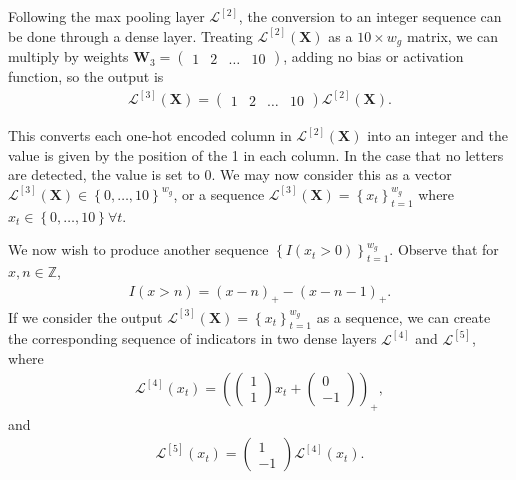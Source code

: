 \documentclass{somasmsc}
\begin{document}
Following the max pooling layer $\mathcal{L}^{\left[2\right]}$, the conversion to an integer sequence can be done through a dense layer. Treating $\mathcal{L}^{\left[2\right]}\left(\mathbf{X}\right)$ as a $10 \times w_g$ matrix, we can multiply by weights $\mathbf{W}_3 =
\begin{pmatrix}
    1 & 2 & \dots & 10
\end{pmatrix}$, adding no bias or activation function, so the output is
\begin{align*}
\mathcal{L}^{\left[3\right]}\left(\mathbf{X}\right) =
\begin{pmatrix}
    1 & 2 & \dots & 10
\end{pmatrix}
\mathcal{L}^{\left[2\right]}\left(\mathbf{X}\right).
\end{align*}

This converts each one-hot encoded column in $\mathcal{L}^{\left[2\right]}\left(\mathbf{X}\right)$ into an integer and the value is given by the position of the 1 in each column. In the case that no letters are detected, the value is set to 0. We may now consider this as a vector $\mathcal{L}^{\left[3\right]}\left(\mathbf{X}\right) \in \left\{0, \dots, 10\right\}^{w_g}$, or a sequence $\mathcal{L}^{\left[3\right]}\left(\mathbf{X}\right) = \left\{x_t\right\}_{t=1}^{w_g}$ where $x_t \in \left\{0, \dots, 10\right\} \forall t$.

We now wish to produce another sequence $\left\{I\left(x_t > 0\right)\right\}_{t=1}^{w_g}$. Observe that for $x, n \in \mathbb{Z}$,
\begin{align}\label{letters:eq1}
I\left(x > n\right) = \left(x - n\right)_+ - \left(x - n - 1\right)_+.
\end{align}
If we consider the output $\mathcal{L}^{\left[3\right]}\left(\mathbf{X}\right) = \left\{x_t\right\}_{t=1}^{w_g}$ as a sequence, we can create the corresponding sequence of indicators in two dense layers $\mathcal{L}^{\left[4\right]}$ and $\mathcal{L}^{\left[5\right]}$, where
\begin{align*}
\mathcal{L}^{\left[4\right]}\left(x_t\right) = \left(
\begin{pmatrix}
    1 \\
    1
\end{pmatrix}
x_t +
\begin{pmatrix}
    0 \\
    -1
\end{pmatrix}\right)_+,
\end{align*}
and
\begin{align*}
\mathcal{L}^{\left[5\right]}\left(x_t\right) =
\begin{pmatrix}
    1 \\
    -1
\end{pmatrix}
\mathcal{L}^{\left[4\right]}\left(x_t\right).
\end{align*}
\end{document}
